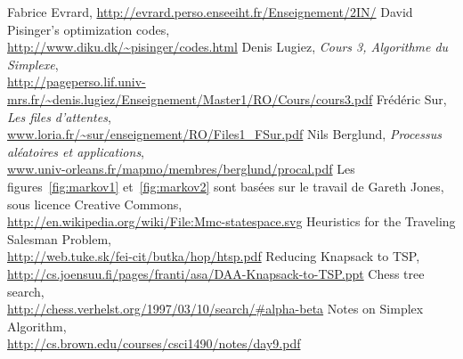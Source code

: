   Fabrice Evrard, \url{http://evrard.perso.enseeiht.fr/Enseignement/2IN/}
  David Pisinger's optimization codes,\\
  \url{http://www.diku.dk/~pisinger/codes.html}
  Denis Lugiez, \emph{Cours 3, Algorithme du Simplexe},\\
  \url{http://pageperso.lif.univ-mrs.fr/~denis.lugiez/Enseignement/Master1/RO/Cours/cours3.pdf}
  Frédéric Sur, \emph{Les files d'attentes}, \\
  \url{www.loria.fr/~sur/enseignement/RO/Files1_FSur.pdf}
  Nils Berglund, \emph{Processus aléatoires et applications}, \\
  \url{www.univ-orleans.fr/mapmo/membres/berglund/procal.pdf}
  Les figures~\ref{fig:markov1} et~\ref{fig:markov2} sont basées sur le travail
  de Gareth Jones, sous licence Creative Commons,\\
  \url{http://en.wikipedia.org/wiki/File:Mmc-statespace.svg}
   Heuristics for the Traveling Salesman Problem,\\
   \url{http://web.tuke.sk/fei-cit/butka/hop/htsp.pdf}
   Reducing Knapsack to TSP,\\
   \url{http://cs.joensuu.fi/pages/franti/asa/DAA-Knapsack-to-TSP.ppt}
   Chess tree search, \\
   \url{http://chess.verhelst.org/1997/03/10/search/#alpha-beta}
  Notes on Simplex Algorithm, \\
  \url{http://cs.brown.edu/courses/csci1490/notes/day9.pdf}

